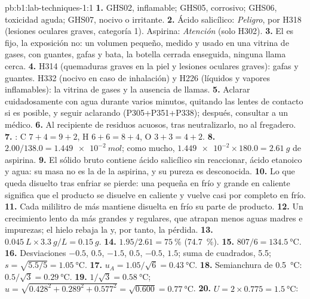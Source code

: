 \begin{solution}{pb:b1:lab-techniques-1:1}
\textbf{1.} GHS02, inflamable; GHS05, corrosivo; GHS06, toxicidad aguda;
GHS07, nocivo o irritante.
\textbf{2.} Ácido salicílico: \emph{Peligro}, por H318 (lesiones oculares
graves, categoría 1). Aspirina: \emph{Atención} (solo H302).
\textbf{3.} El  es fijo, la exposición no: un volumen pequeño,
medido y usado en una vitrina de gases, con guantes, gafas y bata, la
botella cerrada enseguida, ninguna llama cerca.
\textbf{4.} H314 (quemaduras graves en la piel y lesiones oculares
graves): gafas y guantes. H332 (nocivo en caso de inhalación) y H226
(líquidos y vapores inflamables): la vitrina de gases y la ausencia de
llamas.
\textbf{5.} Aclarar cuidadosamente con agua durante varios minutos,
quitando las lentes de contacto si es posible, y seguir aclarando
(P305+P351+P338); después, consultar a un médico.
\textbf{6.} Al recipiente de residuos acuosos, tras neutralizarlo, no al
fregadero.
\textbf{7.} : C $7 + 4 = 9 + 2$,
H $6 + 6 = 8 + 4$, O $3 + 3 = 4 + 2$.
\textbf{8.} $2.00/138.0 = \qty{1.449e-2}{mol}$; como mucho,
$\num{1.449e-2} \times 180.0 = \qty{2.61}{g}$ de aspirina.
\textbf{9.} El sólido bruto contiene ácido salicílico sin reaccionar,
ácido etanoico y agua: su masa no es la de la aspirina, y su pureza es
desconocida.
\textbf{10.} Lo que queda disuelto tras enfriar se pierde: una
 pequeña en frío y grande en caliente significa que el
producto se disuelve en caliente y vuelve casi por completo en frío.
\textbf{11.} Cada mililitro de más mantiene disuelta en frío su parte de
producto.
\textbf{12.} Un crecimiento lento da  más grandes y regulares,
que atrapan menos aguas madres e impurezas; el hielo rebaja la
 y, por tanto, la pérdida.
\textbf{13.} $\qty{0.045}{L} \times \qty{3.3}{g/L} = \qty{0.15}{g}$.
\textbf{14.} $1.95/2.61 = \qty{75}{\percent}$ (\qty{74.7}{\percent}).
\textbf{15.} $807/6 = \qty{134.5}{\celsius}$.
\textbf{16.} Desviaciones $-0.5$, $0.5$, $-1.5$, $0.5$, $-0.5$, $1.5$; suma
de cuadrados, 5.5; $s = \sqrt{5.5/5} = \qty{1.05}{\celsius}$.
\textbf{17.} $u_A = 1.05/\sqrt6 = \qty{0.43}{\celsius}$.
\textbf{18.} Semianchura de \qty{0.5}{\celsius}: $0.5/\sqrt3 = \qty{0.29}{\celsius}$.
\textbf{19.} $1/\sqrt3 = \qty{0.58}{\celsius}$;
$u = \sqrt{0.428^2 + 0.289^2 + 0.577^2} = \sqrt{0.600} = \qty{0.77}{\celsius}$.
\textbf{20.} $U = 2 \times 0.775 = \qty{1.5}{\celsius}$:

\end{solution}
